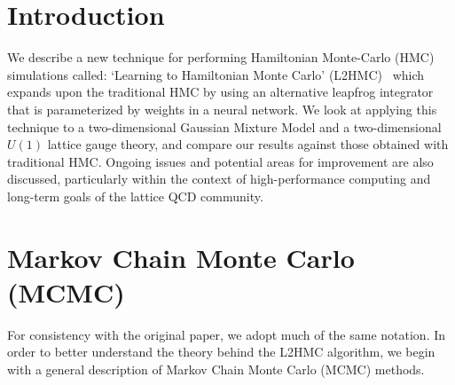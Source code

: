\documentclass[../main.tex]{subfiles}
\begin{document}
\section{Introduction}%
\label{sec:l2hmc_intro}
We describe a new technique for performing Hamiltonian Monte-Carlo (HMC) simulations called: `Learning to Hamiltonian
Monte Carlo' (L2HMC)~\cite{2017arXiv171109268L} which expands upon the traditional HMC by using an alternative leapfrog
integrator that is parameterized by weights in a neural network.
%
We look at applying this technique to a two-dimensional Gaussian Mixture Model and a two-dimensional $U(1)$ lattice
gauge theory, and compare our results against those obtained with traditional HMC. %
%
Ongoing issues and potential areas for improvement are also discussed, particularly within the context of
high-performance computing and long-term goals of the lattice QCD community.
%
\section{Markov Chain Monte Carlo (MCMC)}%
\label{sec:l2hmc_mcmc}
For consistency with the original paper, we adopt much of the same notation.
%
In order to better understand the theory behind the L2HMC algorithm, we begin with a general description of Markov
Chain Monte Carlo (MCMC) methods.
%
\end{document}
